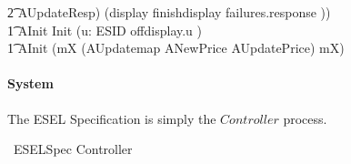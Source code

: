 \begin{circus}
            \t2 AUpdateResp) \circseq (display \then finishdisplay  \then failures.response \then \Skip)) \\
%
    \t1 AInit \circdef Init \circseq (\Interleave u: ESID  \circspot offdisplay.u \then \Skip) \\
%
	\t1 \circspot AInit \circseq (\circmu mX \circspot (AUpdatemap \extchoice ANewPrice \extchoice AUpdatePrice) \circseq mX) \\
%
	\circend
\end{circus}

\paragraph{System}
The ESEL Specification is simply the $Controller$ process.
\begin{circus}
    \circprocess\ ESELSpec \circdef  Controller
\end{circus}
